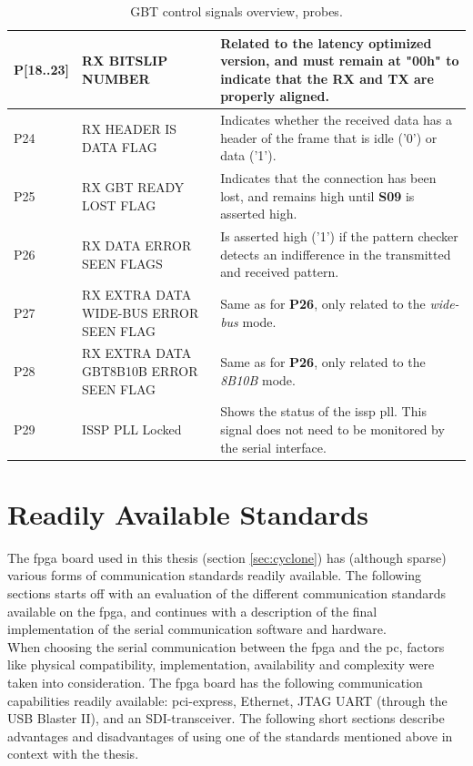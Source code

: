 \documentclass[main.tex]{subfiles}
\begin{document}
\begin{table}[H]
\begin{center}
\begin{tabular}{| l | p{5cm} | p{8cm} |}
  \hline
  P[18..23]   & RX BITSLIP NUMBER         & Related to the latency optimized version, and must remain at "00h" to indicate that the RX and TX are properly aligned. \\
  \hline
  P24       & RX HEADER IS DATA FLAG      & Indicates whether the received data has a header of the frame that is idle ('0') or data ('1'). \\
  \hline
  P25       & RX GBT READY LOST FLAG      & Indicates that the connection has been lost, and remains high until \textbf{S09} is asserted high.\\
  \hline
  P26       & RX DATA ERROR SEEN FLAGS      & Is asserted high ('1') if the pattern checker detects an indifference in the transmitted and received pattern. \\
  \hline
  P27       & RX EXTRA DATA WIDE-BUS ERROR SEEN FLAG      & Same as for \textbf{P26}, only related to the \textit{wide-bus} mode. \\  
  \hline
  P28       & RX EXTRA DATA GBT8B10B ERROR SEEN FLAG      & Same as for \textbf{P26}, only related to the \textit{8B10B} mode. \\
  \hline  
  P29     & ISSP PLL Locked             & Shows the status of the issp pll. This signal does not need to be monitored by the serial interface. \\
  \hline     
  \end{tabular}  
  \caption{GBT control signals overview, probes.}
  \label{tab:probe}
\end{center}
\end{table}

\section{Readily Available Standards}
The \gls{fpga} board used in this thesis (section \ref{sec:cyclone}) has (although sparse) various forms of communication standards readily available. The following sections starts off with an evaluation of the different communication standards available on the \gls{fpga}, and continues with a description of the final implementation of the serial communication software and hardware.\\

When choosing the serial communication between the \gls{fpga} and the \acrshort{pc}, factors like physical compatibility, implementation, availability and complexity were taken into consideration. The \gls{fpga} board has the following communication capabilities readily available: \gls{pci}-express, Ethernet, JTAG UART (through the USB Blaster II), and an SDI-transceiver. The following short sections describe advantages and disadvantages of using one of the standards mentioned above in context with the thesis.
\end{document}
